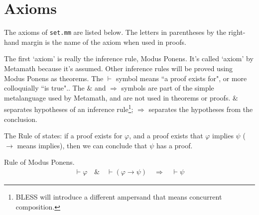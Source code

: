 %


%

\pagebreak
 \section{Axioms}\label{sec:axioms}

\pn The axioms of \texttt{set.mm} are listed below.  The letters in parentheses by the right-hand margin is the name of the axiom when used in proofs.

\pn The first `axiom' is really the inference rule, Modus Ponens.  It's called `axiom' by Metamath because it's assumed.  Other inference rules will be proved using Modus Ponens as theorems.  The $\vdash$ symbol means ``a proof exists for", or more colloquially ``is true"..  The $\&$ and $\Rightarrow$ symbols are part of the simple metalanguage used by Metamath, and are not used in theorems or proofs.  $\&$ separates hypotheses of an inference rule\footnote{BLESS will introduce a different ampersand that means concurrent composition.}; $\Rightarrow$ separates the hypotheses from the conclusion.

\pn The Rule of  states:  if a proof exists for $\varphi$, and a proof exists that $\varphi$ implies $\psi$ ($\rightarrow$ means implies), then we can conclude that $\psi$ has a proof.

\begin{axiom}\label{axi:ax-mp} Rule of Modus Ponens.  
\begin{align}
\vdash \varphi\quad\&\quad \vdash ( \varphi \rightarrow \psi
    )\quad\Rightarrow\quad \vdash \psi\label{eq:ax-mp}\tag{ax-mp}
\end{align}
\end{axiom}

